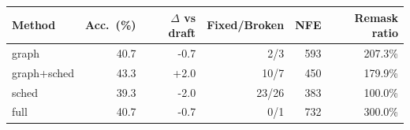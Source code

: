 \begin{tabular}{lrrrrr}
\toprule
Method & Acc.\ (\%) & $\Delta$ vs draft & Fixed/Broken & NFE & Remask ratio \\
\midrule
graph & 40.7 & -0.7 & 2/3 & 593 & 207.3\% \\
graph+sched & 43.3 & +2.0 & 10/7 & 450 & 179.9\% \\
sched & 39.3 & -2.0 & 23/26 & 383 & 100.0\% \\
full & 40.7 & -0.7 & 0/1 & 732 & 300.0\% \\
\bottomrule
\end{tabular}

